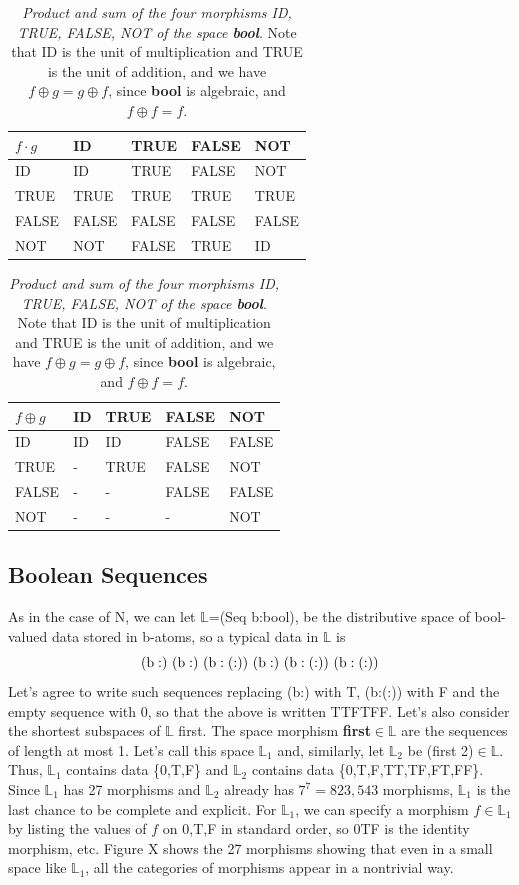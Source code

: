 \documentclass[11pt]{article}
\begin{document}
\begin{table}
\begin{tabular}{| l | l | l | l | l |  }
$f\cdot g$ & ID & TRUE & FALSE & NOT  \\
\hline
ID &  ID & TRUE & FALSE &  NOT \\
TRUE & TRUE & TRUE  & TRUE & TRUE \\
FALSE & FALSE  & FALSE & FALSE & FALSE   \\
NOT & NOT & FALSE & TRUE & ID \\
\hline
\end{tabular}
\begin{tabular}{| l | l | l | l | l |  }
$f\oplus g$ & ID & TRUE & FALSE & NOT  \\
\hline
ID &  ID & ID & FALSE & FALSE \\
TRUE & - & TRUE  & FALSE & NOT \\
FALSE & -  & - & FALSE & FALSE   \\
NOT & - & - & - & NOT \\
\hline
\end{tabular}
\caption{{\it Product and sum of the four morphisms ID, TRUE, FALSE, NOT of the space {\bf bool}}.  Note that ID is the unit of multiplication and TRUE is the 
unit of addition, and we have $f\oplus g=g\oplus f$, since {\bf bool} is algebraic, and $f\oplus f=f$.}
\end{table}

\subsection{Boolean Sequences}

As in the case of N, we can let $\mathbb L$=(Seq b:bool), be the distributive space of bool-valued data stored in b-atoms, so a typical data in $\mathbb L$ is 
\begin{equation}
{\rm (b:)\ (b:)\ (b:(:))\ (b:)\ (b:(:))\ (b:(:))}
\end{equation}
Let's agree to write such sequences replacing (b:) with T, (b:(:)) with F and the empty sequence with 0, so that the above is written TTFTFF.   
Let's also consider the shortest subspaces of $\mathbb L$ first.  The space morphism {\bf first}$\in\mathbb L$ are the sequences of length at most 1.  
Let's call this space ${\mathbb L}_1$ and, similarly, let ${\mathbb L}_2$ be (first 2)$\in\mathbb L$.  Thus, ${\mathbb L}_1$ contains data \{0,T,F\} and ${\mathbb L}_2$ contains data \{0,T,F,TT,TF,FT,FF\}. 
Since ${\mathbb L}_1$ has 27 morphisms and ${\mathbb L}_2$ already has $7^7=823,543$ morphisms, ${\mathbb L}_1$ is the last chance to be complete and explicit.  
For ${\mathbb L}_1$, we can specify a morphism $f\in {\mathbb L}_1$ by listing the values of $f$ on 0,T,F in standard order, so 0TF is the identity morphism, etc.  
Figure X shows the 27 morphisms showing that even in a small space like ${\mathbb L}_1$, all the categories of morphisms appear in a nontrivial way.  
\end{document}
